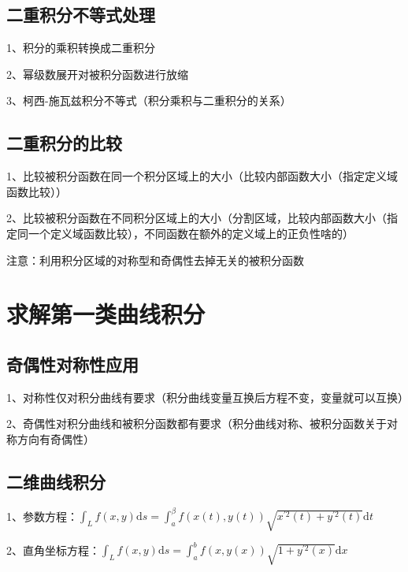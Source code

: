 \subsection{二重积分不等式处理}

1、积分的乘积转换成二重积分

2、幂级数展开对被积分函数进行放缩

3、柯西-施瓦兹积分不等式（积分乘积与二重积分的关系）



\subsection{二重积分的比较}

1、比较被积分函数在同一个积分区域上的大小（比较内部函数大小（指定定义域函数比较））

2、比较被积分函数在不同积分区域上的大小（分割区域，比较内部函数大小（指定同一个定义域函数比较），不同函数在额外的定义域上的正负性啥的）

注意：利用积分区域的对称型和奇偶性去掉无关的被积分函数



\section{求解第一类曲线积分}



\subsection{奇偶性对称性应用}

1、对称性仅对积分曲线有要求（积分曲线变量互换后方程不变，变量就可以互换）

2、奇偶性对积分曲线和被积分函数都有要求（积分曲线对称、被积分函数关于对称方向有奇偶性）



\subsection{二维曲线积分}

1、参数方程：$\int_{L} f(x, y) \mathrm{d} s=\int_{a}^{\beta} f(x(t), y(t)) \sqrt{x^{\prime 2}(t)+y^{\prime 2}(t)} \mathrm{d} t$

2、直角坐标方程：$\int_{L} f(x, y) \mathrm{d} s=\int_{a}^{b} f(x, y(x)) \sqrt{1+y^{\prime 2}(x)} \mathrm{d} x$

